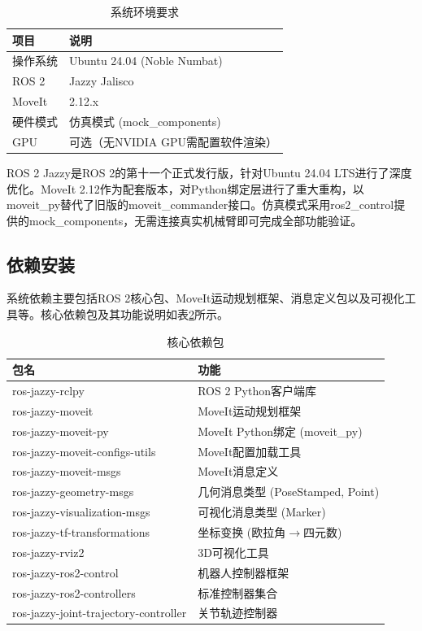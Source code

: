 \documentclass[a4paper,12pt]{ctexart}
\newcommand{\bodytext}{\fontsize{12pt}{20pt}\selectfont\setlength{\parskip}{0pt}}
\begin{document}
\begin{table}[htbp]
\centering
\caption{系统环境要求}
\label{tab:env}
\begin{tabular}{ll}
\toprule
项目 & 说明 \\
\midrule
操作系统 & Ubuntu 24.04 (Noble Numbat) \\
ROS 2 & Jazzy Jalisco \\
MoveIt & 2.12.x \\
硬件模式 & 仿真模式 (mock\_components) \\
GPU & 可选（无NVIDIA GPU需配置软件渲染） \\
\bottomrule
\end{tabular}
\end{table}

ROS 2 Jazzy是ROS 2的第十一个正式发行版，针对Ubuntu 24.04 LTS进行了深度优化。MoveIt 2.12作为配套版本，对Python绑定层进行了重大重构，以moveit\_py替代了旧版的moveit\_commander接口。仿真模式采用ros2\_control提供的mock\_components，无需连接真实机械臂即可完成全部功能验证。

\subsection{依赖安装}

\bodytext

系统依赖主要包括ROS 2核心包、MoveIt运动规划框架、消息定义包以及可视化工具等。核心依赖包及其功能说明如表\ref{tab:deps}所示。

\begin{table}[htbp]
\centering
\caption{核心依赖包}
\label{tab:deps}
\begin{tabular}{ll}
\toprule
包名 & 功能 \\
\midrule
ros-jazzy-rclpy & ROS 2 Python客户端库 \\
ros-jazzy-moveit & MoveIt运动规划框架 \\
ros-jazzy-moveit-py & MoveIt Python绑定 (moveit\_py) \\
ros-jazzy-moveit-configs-utils & MoveIt配置加载工具 \\
ros-jazzy-moveit-msgs & MoveIt消息定义 \\
ros-jazzy-geometry-msgs & 几何消息类型 (PoseStamped, Point) \\
ros-jazzy-visualization-msgs & 可视化消息类型 (Marker) \\
ros-jazzy-tf-transformations & 坐标变换 (欧拉角$\to$四元数) \\
ros-jazzy-rviz2 & 3D可视化工具 \\
ros-jazzy-ros2-control & 机器人控制器框架 \\
ros-jazzy-ros2-controllers & 标准控制器集合 \\
ros-jazzy-joint-trajectory-controller & 关节轨迹控制器 \\
\bottomrule
\end{tabular}
\end{table}
\end{document}
